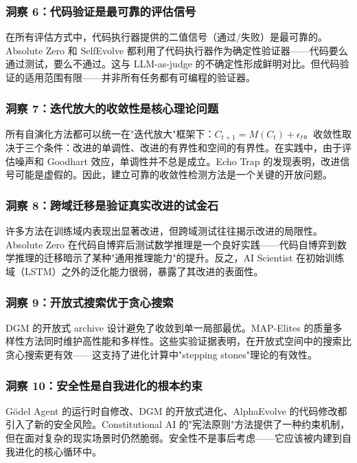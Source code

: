 \subsubsection{洞察 6：代码验证是最可靠的评估信号}

在所有评估方式中，代码执行器提供的二值信号（通过/失败）是最可靠的。Absolute Zero 和 SelfEvolve 都利用了代码执行器作为确定性验证器——代码要么通过测试，要么不通过。这与 LLM-as-judge 的不确定性形成鲜明对比。但代码验证的适用范围有限——并非所有任务都有可编程的验证器。

\subsubsection{洞察 7：迭代放大的收敛性是核心理论问题}

所有自演化方法都可以统一在"迭代放大"框架下：$C_{t+1} = M(C_t) + \epsilon_t$。收敛性取决于三个条件：改进的单调性、改进的有界性和空间的有界性。在实践中，由于评估噪声和 Goodhart 效应，单调性并不总是成立。Echo Trap 的发现表明，改进信号可能是虚假的。因此，建立可靠的收敛性检测方法是一个关键的开放问题。

\subsubsection{洞察 8：跨域迁移是验证真实改进的试金石}

许多方法在训练域内表现出显著改进，但跨域测试往往揭示改进的局限性。Absolute Zero 在代码自博弈后测试数学推理是一个良好实践——代码自博弈到数学推理的迁移暗示了某种"通用推理能力"的提升。反之，AI Scientist 在初始训练域（LSTM）之外的泛化能力很弱，暴露了其改进的表面性。

\subsubsection{洞察 9：开放式搜索优于贪心搜索}

DGM 的开放式 archive 设计避免了收敛到单一局部最优。MAP-Elites 的质量多样性方法同时维护高性能和多样性。这些实验证据表明，在开放式空间中的搜索比贪心搜索更有效——这支持了进化计算中"stepping stones"理论的有效性。

\subsubsection{洞察 10：安全性是自我进化的根本约束}

Gödel Agent 的运行时自修改、DGM 的开放式进化、AlphaEvolve 的代码修改都引入了新的安全风险。Constitutional AI 的"宪法原则"方法提供了一种约束机制，但在面对复杂的现实场景时仍然脆弱。安全性不是事后考虑——它应该被内建到自我进化的核心循环中。

